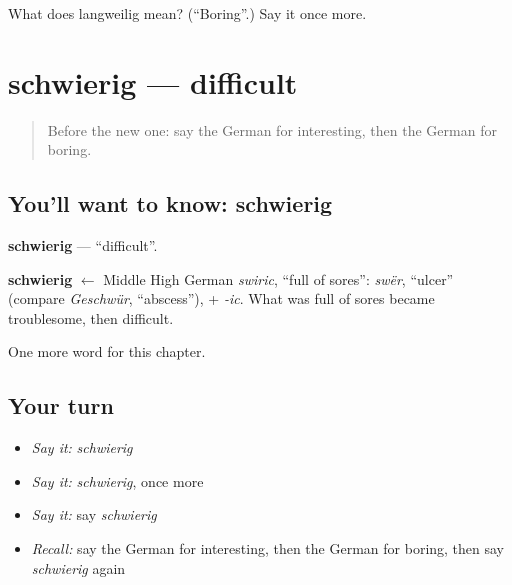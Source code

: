 \begin{tcolorbox}[breakable,colback=teal!4,colframe=teal!35!black,title={Before you move on}]
What does langweilig mean? (\textquotedblleft{}Boring\textquotedblright{}.) Say it once more.
\end{tcolorbox}
\section[schwierig]{schwierig — difficult}

\label{lesson:GE-C134-schwierig}



\begin{quote}
Before the new one: say the German for interesting, then the German for boring.
\end{quote}

\subsection*{You'll want to know: schwierig}
\textbf{schwierig} — \textquotedblleft{}difficult\textquotedblright{}.

\begin{cousinweb}
\textbf{schwierig} $\leftarrow$ Middle High German \emph{swiric}, \textquotedblleft{}full of sores\textquotedblright{}: \emph{swër}, \textquotedblleft{}ulcer\textquotedblright{} (compare \emph{Geschwür}, \textquotedblleft{}abscess\textquotedblright{}), + \emph{-ic}. What was full of sores became troublesome, then difficult.
\end{cousinweb}

\begin{grammarlens}[title={What you've built}]
One more word for this chapter.
\end{grammarlens}

\subsection*{Your turn}
\begin{itemize}
\raggedright
  \item \emph{Say it:} \emph{schwierig}
  \item \emph{Say it:} \emph{schwierig}, once more
  \item \emph{Say it:} say \emph{schwierig}
  \item \emph{Recall:} say the German for interesting, then the German for boring, then say \emph{schwierig} again
\end{itemize}

